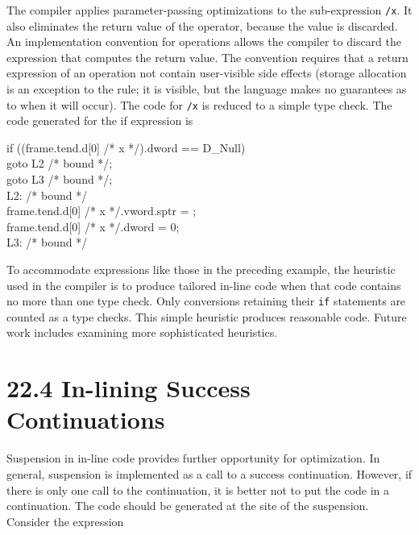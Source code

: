 
\noindent
The compiler applies parameter-passing optimizations to the
sub-expression \texttt{/x}. It also eliminates the return value of the
operator, because the value is discarded. An implementation convention
for operations allows the compiler to discard the expression that
computes the return value. The convention requires that a return
expression of an operation not contain user-visible side effects
(storage allocation is an exception to the rule; it is visible, but
the language makes no guarantees as to when it will occur). The code
for \texttt{/x} is reduced to a simple type check. The code generated for the
if expression is

\goodbreak
\begin{iconcode}
\>\>if ((frame.tend.d[0] /* x */).dword == D\_Null)\\
\>\>\>goto L2 /* bound */;\\
\>\>goto L3 /* bound */;\\
\>L2: /* bound */\\
\>\>frame.tend.d[0] /* x */.vword.sptr = ;\\
\>\>frame.tend.d[0] /* x */.dword = 0;\\
\>L3: /* bound */\\
\end{iconcode}


To accommodate expressions like those in the preceding example, the
heuristic used in the compiler is to produce tailored in-line code
when that code contains no more than one type check. Only conversions
retaining their \texttt{if} statements are counted as a type checks. This
simple heuristic produces reasonable code. Future work includes
examining more sophisticated heuristics.


\section[22.4 In-lining Success Continuations]{22.4 In-lining Success Continuations}

Suspension in in-line code provides further opportunity for
optimization. In general, suspension is implemented as a call to a
success continuation. However, if there is only one call to the
continuation, it is better not to put the code in a continuation. The
code should be generated at the site of the suspension. Consider the
expression


